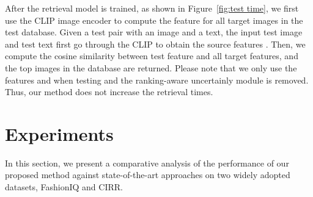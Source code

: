 \documentclass[letterpaper]{article} \usepackage{aaai24}  \usepackage{times}  \usepackage{helvet}  \usepackage{courier}  \usepackage[hyphens]{url}  \usepackage{graphicx} \urlstyle{rm} \def\UrlFont{\rm}  \usepackage{natbib}  \usepackage{caption} \frenchspacing  \setlength{\pdfpagewidth}{8.5in} \setlength{\pdfpageheight}{11in} \usepackage{amsmath,amsfonts}
\begin{document}
After the retrieval model is trained, as shown in Figure~\ref{fig:test time}, we first use the CLIP image encoder to compute the feature  for all target images in the test database. Given a test pair with an image and a text, 
the input test image and test text first go through the CLIP to obtain the source features . Then, we compute the cosine similarity between test feature and all target features, and the top   images in the database are returned. Please note that we only use the features  and  when testing and the ranking-aware uncertainly module is removed. Thus, our method does not increase the retrieval times.  

\section{Experiments}
In this section, we present a comparative analysis of the performance of our proposed method against state-of-the-art approaches on two widely adopted datasets, FashionIQ and CIRR.
\end{document}
